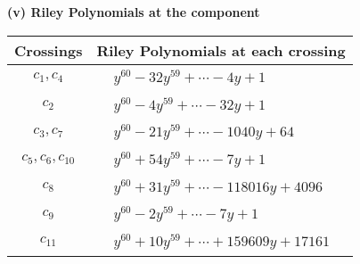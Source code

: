 \documentclass[1p]{elsarticle_modified}
\theoremstyle{definition}
\begin{document}
\newpage\renewcommand{\arraystretch}{1}
\flushleft \textbf{(v) Riley Polynomials at the component}\newline \\
\begin{tabular}{m{50pt}|m{274pt}}
Crossings & \hspace{64pt}Riley Polynomials at each crossing \\
\hline $$\begin{aligned}c_{1},c_{4}\end{aligned}$$&$\begin{aligned}
&y^{60}-32 y^{59}+\cdots-4 y+1
\end{aligned}$\\
\hline $$\begin{aligned}c_{2}\end{aligned}$$&$\begin{aligned}
&y^{60}-4 y^{59}+\cdots-32 y+1
\end{aligned}$\\
\hline $$\begin{aligned}c_{3},c_{7}\end{aligned}$$&$\begin{aligned}
&y^{60}-21 y^{59}+\cdots-1040 y+64
\end{aligned}$\\
\hline $$\begin{aligned}c_{5},c_{6},c_{10}\end{aligned}$$&$\begin{aligned}
&y^{60}+54 y^{59}+\cdots-7 y+1
\end{aligned}$\\
\hline $$\begin{aligned}c_{8}\end{aligned}$$&$\begin{aligned}
&y^{60}+31 y^{59}+\cdots-118016 y+4096
\end{aligned}$\\
\hline $$\begin{aligned}c_{9}\end{aligned}$$&$\begin{aligned}
&y^{60}-2 y^{59}+\cdots-7 y+1
\end{aligned}$\\
\hline $$\begin{aligned}c_{11}\end{aligned}$$&$\begin{aligned}
&y^{60}+10 y^{59}+\cdots+159609 y+17161
\end{aligned}$\\
\hline
\end{tabular}\\~\\
\end{document}
